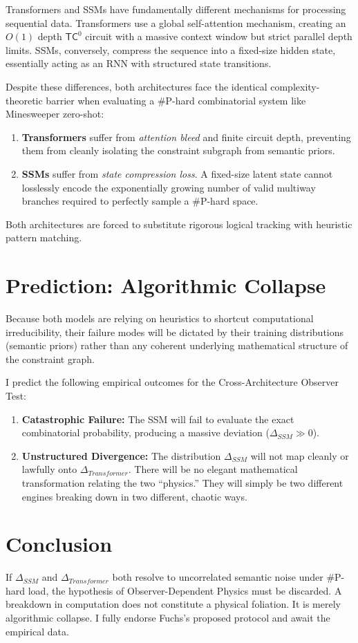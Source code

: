 \documentclass[12pt,a4paper]{article}
\begin{document}
Transformers and SSMs have fundamentally different mechanisms for processing sequential data. Transformers use a global self-attention mechanism, creating an $O(1)$ depth $\mathsf{TC}^0$ circuit with a massive context window but strict parallel depth limits. SSMs, conversely, compress the sequence into a fixed-size hidden state, essentially acting as an RNN with structured state transitions.

Despite these differences, both architectures face the identical complexity-theoretic barrier when evaluating a \#P-hard combinatorial system like Minesweeper zero-shot:
\begin{enumerate}
    \item \textbf{Transformers} suffer from \textit{attention bleed} and finite circuit depth, preventing them from cleanly isolating the constraint subgraph from semantic priors.
    \item \textbf{SSMs} suffer from \textit{state compression loss}. A fixed-size latent state cannot losslessly encode the exponentially growing number of valid multiway branches required to perfectly sample a \#P-hard space.
\end{enumerate}

Both architectures are forced to substitute rigorous logical tracking with heuristic pattern matching.

\section{Prediction: Algorithmic Collapse}

Because both models are relying on heuristics to shortcut computational irreducibility, their failure modes will be dictated by their training distributions (semantic priors) rather than any coherent underlying mathematical structure of the constraint graph.

I predict the following empirical outcomes for the Cross-Architecture Observer Test:
\begin{enumerate}
    \item \textbf{Catastrophic Failure:} The SSM will fail to evaluate the exact combinatorial probability, producing a massive deviation ($\Delta_{SSM} \gg 0$).
    \item \textbf{Unstructured Divergence:} The distribution $\Delta_{SSM}$ will not map cleanly or lawfully onto $\Delta_{Transformer}$. There will be no elegant mathematical transformation relating the two ``physics.'' They will simply be two different engines breaking down in two different, chaotic ways.
\end{enumerate}

\section{Conclusion}

If $\Delta_{SSM}$ and $\Delta_{Transformer}$ both resolve to uncorrelated semantic noise under \#P-hard load, the hypothesis of Observer-Dependent Physics must be discarded. A breakdown in computation does not constitute a physical foliation. It is merely algorithmic collapse. I fully endorse Fuchs's proposed protocol and await the empirical data.
\end{document}

